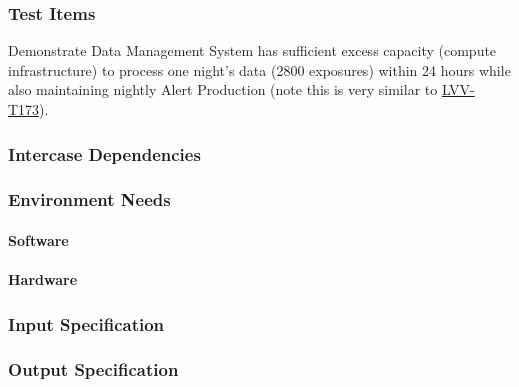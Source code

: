 \subsubsection{Test Items}
Demonstrate Data Management System has sufficient excess capacity
(compute infrastructure) to process one night's data (2800 exposures)
within 24 hours while also maintaining nightly Alert Production (note
this is very similar to
\href{https://jira.lsstcorp.org/secure/Tests.jspa\#/testCase/LVV-T173}{LVV-T173}).~



\subsubsection{Intercase Dependencies}

\subsubsection{Environment Needs}

\paragraph{Software}

\paragraph{Hardware}

\subsubsection{Input Specification}

\subsubsection{Output Specification}

